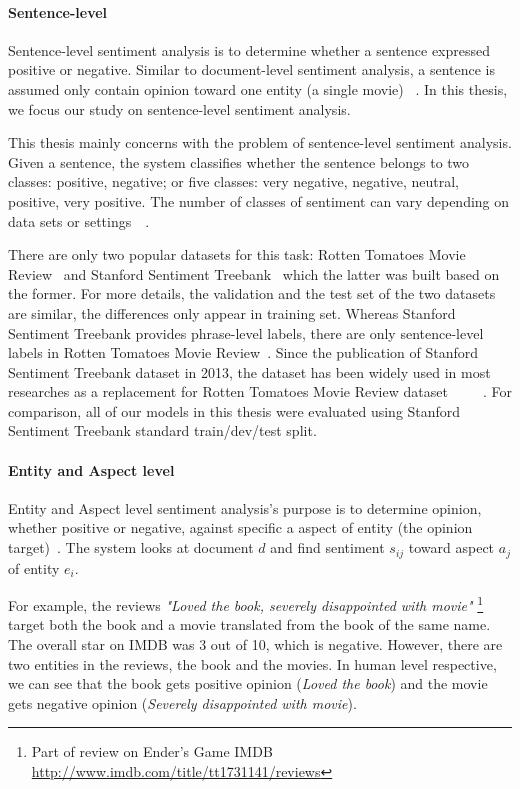 \paragraph{Sentence-level}\label{sec:sent-level}
Sentence-level sentiment analysis is to determine whether a sentence expressed positive or negative. Similar to document-level sentiment analysis, a sentence is assumed only contain opinion toward one entity (a single movie) ~\cite{liu2012sentiment}.
In this thesis, we focus our study on sentence-level sentiment analysis.

This thesis mainly concerns with the problem of sentence-level sentiment analysis.
Given a sentence, the system classifies whether the sentence belongs to two classes: positive, negative; or five classes: very negative, negative, neutral, positive, very positive.
The number of classes of sentiment can vary depending on data sets or settings~\cite{Rotten-Tomato}~\cite{socher2013recursive}.

There are only two popular datasets for this task: Rotten Tomatoes Movie Review~\cite{Rotten-Tomato} and Stanford Sentiment Treebank~\cite{socher2013recursive} which the latter was built based on the former.
For more details, the validation and the test set of the two datasets are similar, the differences only appear in training set.
Whereas Stanford Sentiment Treebank provides phrase-level labels, there are only sentence-level labels in Rotten Tomatoes Movie Review~\cite{socher2013recursive}.
Since the publication of Stanford Sentiment Treebank dataset in 2013, the dataset has been widely used in most researches as a replacement for Rotten Tomatoes Movie Review dataset~\cite{treeLSTM}~\cite{KimCNN}~\cite{cnn-rnn}~\cite{2-layer-cnn}~\cite{socher2013recursive}.
For comparison, all of our models in this thesis were evaluated using Stanford Sentiment Treebank standard train/dev/test split.

\paragraph{Entity and Aspect level}
Entity and Aspect level sentiment analysis's purpose is to determine opinion, whether positive or negative, against specific a aspect of entity (the opinion target)~\cite{liu2012sentiment}. The system looks at document $d$ and find sentiment $s_{ij}$ toward aspect $a_{j}$ of entity $e_{i}$.

For example, the reviews \textit{"Loved the book, severely disappointed with movie"} \footnote{Part of review on Ender's Game IMDB \url{http://www.imdb.com/title/tt1731141/reviews}} target both the book and a movie translated from the book of the same name. The overall star on IMDB was 3 out of 10, which is negative. However, there are two entities in the reviews, the book and the movies. In human level respective, we can see that the book gets positive opinion (\textit{Loved the book}) and the movie gets negative opinion (\textit{Severely disappointed with movie}).


